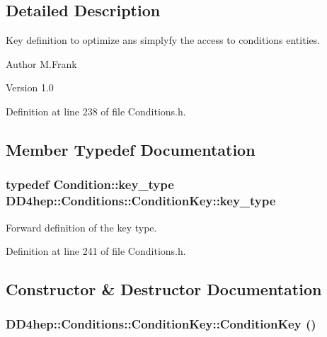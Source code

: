 \subsection{Detailed Description}
Key definition to optimize ans simplyfy the access to conditions entities. \begin{DoxyAuthor}{Author}
M.Frank 
\end{DoxyAuthor}
\begin{DoxyVersion}{Version}
1.0 
\end{DoxyVersion}


Definition at line 238 of file Conditions.h.

\subsection{Member Typedef Documentation}
\hypertarget{class_d_d4hep_1_1_conditions_1_1_condition_key_a08bfc8ccb807bdd5e4d9f3b065d1c8f5}{
\subsubsection[{key\_\-type}]{\setlength{\rightskip}{0pt plus 5cm}typedef {\bf Condition::key\_\-type} {\bf DD4hep::Conditions::ConditionKey::key\_\-type}}}
\label{class_d_d4hep_1_1_conditions_1_1_condition_key_a08bfc8ccb807bdd5e4d9f3b065d1c8f5}


Forward definition of the key type. 

Definition at line 241 of file Conditions.h.

\subsection{Constructor \& Destructor Documentation}
\hypertarget{class_d_d4hep_1_1_conditions_1_1_condition_key_a032d6c5ca16bc201fb7166d686a6207a}{
\subsubsection[{ConditionKey}]{\setlength{\rightskip}{0pt plus 5cm}DD4hep::Conditions::ConditionKey::ConditionKey ()}}
\label{class_d_d4hep_1_1_conditions_1_1_condition_key_a032d6c5ca16bc201fb7166d686a6207a}


